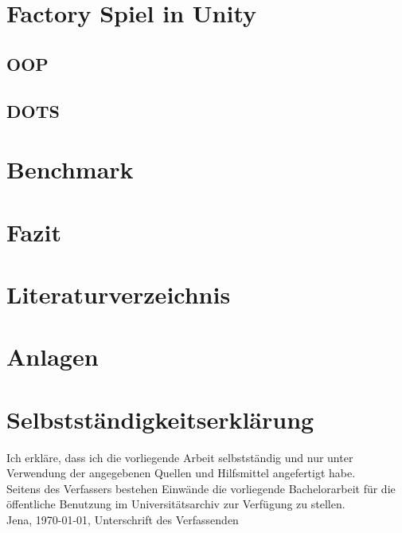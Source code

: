 \documentclass[12pt, titlepage]{article}
\begin{document}
\section{Factory Spiel in Unity}
\subsection{OOP}
\subsection{DOTS}
\newpage
\section{Benchmark}
\newpage
\section{Fazit}
\newpage
\section{Literaturverzeichnis}



\newpage
\section{Anlagen}
\newpage
\section{Selbstständigkeitserklärung}
Ich erkläre, dass ich die vorliegende Arbeit selbstständig und nur unter Verwendung der
angegebenen Quellen und Hilfsmittel angefertigt habe.\\
Seitens des Verfassers bestehen Einwände die vorliegende Bachelorarbeit für die öffentliche Benutzung im
Universitätsarchiv zur Verfügung zu stellen.\\
Jena, \today, Unterschrift des Verfassenden
\end{document}
